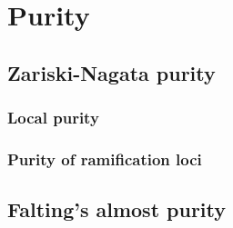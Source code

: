 \chapter{Purity}
    \begin{abstract}
        
    \end{abstract}
    
    \minitoc
    
    \section{Zariski-Nagata purity}
        \subsection{Local purity}
        
        \subsection{Purity of ramification loci}
    
    \section{Falting's almost purity}